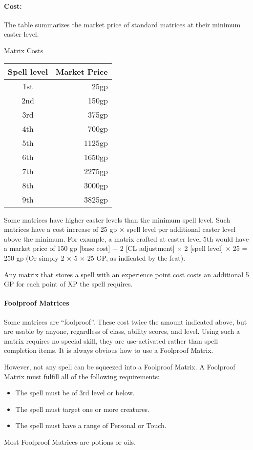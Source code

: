 \paragraph{Cost:} The  table summarizes the market price of standard matrices at their minimum caster level.
\begin{tableonecolumn}
\caption{Matrix Costs}
\label{tab:MatrixCosts}
\begin{tabular}{|c|r|}
\hline
\textbf{Spell level}&\textbf{Market Price}\\
\hline
1st&	25gp	\\
2nd&	150gp	\\
3rd&	375gp	\\
4th&	700gp	\\
5th&	1125gp	\\
6th&	1650gp	\\
7th&	2275gp	\\
8th&	3000gp	\\
9th&	3825gp	\\
\hline
\end{tabular}
\end{tableonecolumn}
Some matrices have higher caster levels than the minimum spell level. Such matrices have a cost increase of 25 gp $\times$ spell level per additional caster level above the minimum. For example, a  matrix crafted at caster level 5th would have a market price of 150 gp [base cost] + 2 [CL adjustment] $\times$ 2 [spell level] $\times$ 25 = 250 gp (Or simply 2 $\times$ 5 $\times$ 25 GP, as indicated by the  feat).

Any matrix that stores a spell with an experience point cost costs an additional 5 GP for each point of XP the spell requires.
\paragraph{Foolproof Matrices}
\label{Item:FoolproofMatrices}
Some matrices are ``foolproof''. These cost twice the amount indicated above, but are usable by anyone, regardless of class, ability scores, and level.
Using such a matrix requires no special skill, they are use-activated rather than spell completion items.
It is always obvious how to use a Foolproof Matrix.

However, not any spell can be squeezed into a Foolproof Matrix. A Foolproof Matrix must fulfill all of the following requirements:
\begin{itemize}
 \item The spell must be of 3rd level or below.
 \item The spell must target one or more creatures.
 \item The spell must have a range of Personal or Touch.
\end{itemize}
Most Foolproof Matrices are potions or oils.
